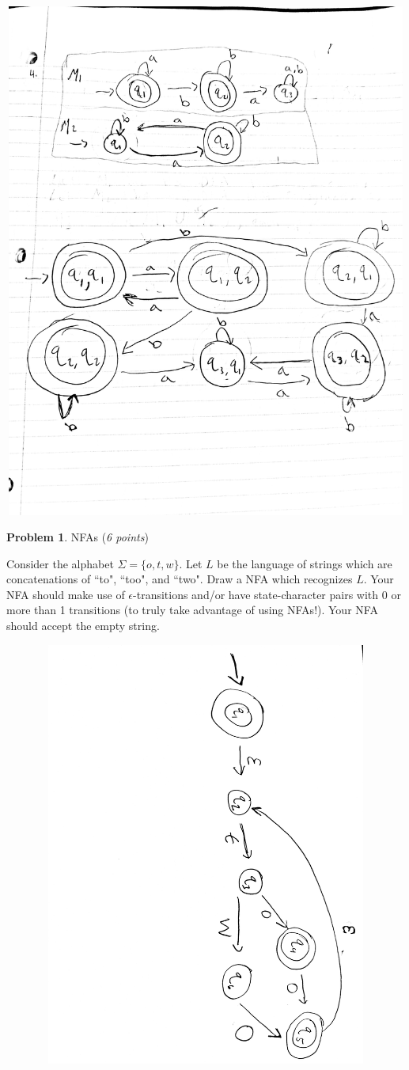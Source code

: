 \documentclass[11pt]{article}
\theoremstyle{definition}
\theoremstyle{theorem}
\newtheorem{prob}{Problem}
\newcommand{\solution}{\medskip\noindent{\color{blue}\textbf{Solution:}}}
\begin{document}
\includegraphics[width=15cm, height=17cm]{./images/prob4.jpg}


\newpage

\begin{prob} NFAs (\emph{6 points})\end{prob}


 Consider the alphabet $\Sigma = \{o, t, w\}$. Let $L$ be the language of strings which are concatenations of ``to", ``too", and ``two".  Draw a NFA which recognizes $L$. Your NFA should make use of $\epsilon$-transitions and/or have state-character pairs with 0 or more than 1 transitions (to truly take advantage of using NFAs!).  Your NFA should accept the empty string.

\solution

\includegraphics[angle=90,origin=c, width=16cm, height=14cm]{./images/prob5a.jpg}
\end{document}
